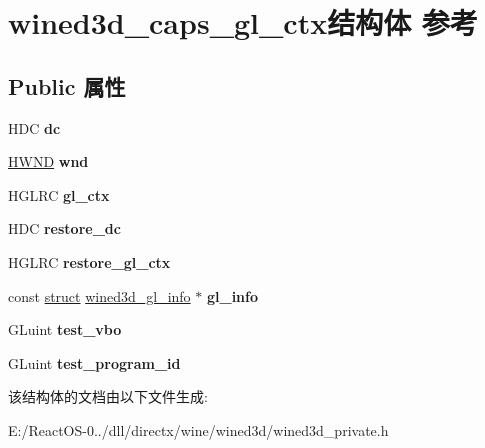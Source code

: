 \hypertarget{structwined3d__caps__gl__ctx}{}\section{wined3d\+\_\+caps\+\_\+gl\+\_\+ctx结构体 参考}
\label{structwined3d__caps__gl__ctx}
\subsection*{Public 属性}
\begin{DoxyCompactItemize}
\item 
\mbox{\label{structwined3d__caps__gl__ctx_a066007e5acd9d468b06ff4bd4b7f5541}} 
H\+DC {\bfseries dc}
\item 
\mbox{\label{structwined3d__caps__gl__ctx_afbccfcaa692bd1eea05923946e6eb9cc}} 
\hyperlink{interfacevoid}{H\+W\+ND} {\bfseries wnd}
\item 
\mbox{\label{structwined3d__caps__gl__ctx_a06bc0ad077b65523532b68293f8e7535}} 
H\+G\+L\+RC {\bfseries gl\+\_\+ctx}
\item 
\mbox{\label{structwined3d__caps__gl__ctx_a2da9dc2827b16b68a4f43bd8ad65c494}} 
H\+DC {\bfseries restore\+\_\+dc}
\item 
\mbox{\label{structwined3d__caps__gl__ctx_aa0e552f8846651a50bcd4442d80814a5}} 
H\+G\+L\+RC {\bfseries restore\+\_\+gl\+\_\+ctx}
\item 
\mbox{\label{structwined3d__caps__gl__ctx_a615cba399e356092685224c7aaa6265b}} 
const \hyperlink{interfacestruct}{struct} \hyperlink{structwined3d__gl__info}{wined3d\+\_\+gl\+\_\+info} $\ast$ {\bfseries gl\+\_\+info}
\item 
\mbox{\label{structwined3d__caps__gl__ctx_a7710daa9d11d0445a3961a44cfe2bdb6}} 
G\+Luint {\bfseries test\+\_\+vbo}
\item 
\mbox{\label{structwined3d__caps__gl__ctx_a121fca1ad6f091c76446519eca06e825}} 
G\+Luint {\bfseries test\+\_\+program\+\_\+id}
\end{DoxyCompactItemize}


该结构体的文档由以下文件生成\+:\begin{DoxyCompactItemize}
\item 
E\+:/\+React\+O\+S-\/0../dll/directx/wine/wined3d/wined3d\+\_\+private.\+h\end{DoxyCompactItemize}
